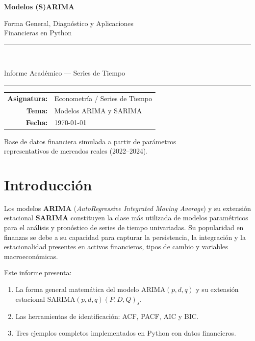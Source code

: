 \documentclass[12pt,a4paper]{article}
\begin{document}
\begin{titlepage}
  \centering
  \vspace*{2cm}
  {\huge\bfseries\color{azul} Modelos (S)ARIMA\par}
  \vspace{0.4cm}
  {\Large\color{gris} Forma General, Diagn{\'o}stico y Aplicaciones\\Financieras en Python\par}
  \vspace{2cm}
  \rule{\linewidth}{0.8pt}\\[0.3cm]
  {\large Informe Acad{\'e}mico --- Series de Tiempo\par}
  \rule{\linewidth}{0.8pt}
  \vspace{2cm}

  \begin{tabular}{rl}
    \textbf{Asignatura:} & Econometr{\'i}a / Series de Tiempo \\[4pt]
    \textbf{Tema:}       & Modelos ARIMA y SARIMA \\[4pt]
    \textbf{Fecha:}      & \today \\[4pt]
  \end{tabular}

  \vfill
  {\small\color{gris}
    Base de datos financiera simulada a partir de par{\'a}metros\\
    representativos de mercados reales (2022--2024).}
\end{titlepage}

\tableofcontents
\newpage

\section{Introducci{\'o}n}

Los modelos \textbf{ARIMA} (\textit{AutoRegressive Integrated Moving Average}) y su extensi{\'o}n
estacional \textbf{SARIMA} constituyen la clase m{\'a}s utilizada de modelos param{\'e}tricos para
el an{\'a}lisis y pron{\'o}stico de series de tiempo univariadas. Su popularidad en finanzas se
debe a su capacidad para capturar la persistencia, la integraci{\'o}n y la estacionalidad
presentes en activos financieros, tipos de cambio y variables macroecon{\'o}micas.

Este informe presenta:
\begin{enumerate}[label=\arabic*.]
  \item La forma general matem{\'a}tica del modelo ARIMA$(p,d,q)$ y su extensi{\'o}n estacional
        SARIMA$(p,d,q)(P,D,Q)_s$.
  \item Las herramientas de identificaci{\'o}n: ACF, PACF, AIC y BIC.
  \item Tres ejemplos completos implementados en Python con datos financieros.
\end{enumerate}
\end{document}
